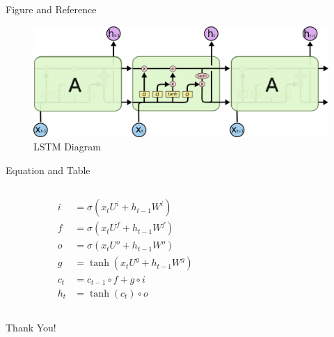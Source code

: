 \documentclass[presentation, aspectratio=54]{beamer}
\begin{document}
\begin{frame}{Figure and Reference}

\begin{center}
\begin{figure}
\includegraphics[width=0.9\linewidth]{figure/LSTM3-chain.png}
\caption{LSTM Diagram }
\label{fig:campus}
\end{figure}
\end{center}

\end{frame}

\begin{frame}{Equation and Table}

\begin{columns}
\begin{column}{0.5\textwidth}
\begin{align*}
i &=\sigma(x_tU^i + h_{t-1} W^i) \\
f &=\sigma(x_t U^f +h_{t-1} W^f) \\  
o &=\sigma(x_t U^o + h_{t-1} W^o) \\  
g &=\tanh(x_t U^g + h_{t-1}W^g) \\  
c_t &= c_{t-1} \circ f + g \circ i \\  
h_t &=\tanh(c_t) \circ o  
\end{align*}  
\end{column}

\begin{column}{0.5\textwidth}
\begin{table}[]
\centering
\caption{Sample Table}
\label{tab:sample}
\end{table}
\end{column}
\end{columns}

\end{frame}

\begin{frame}
\begin{center}
\Huge Thank You!
\end{center}
\end{frame}
\end{document}
